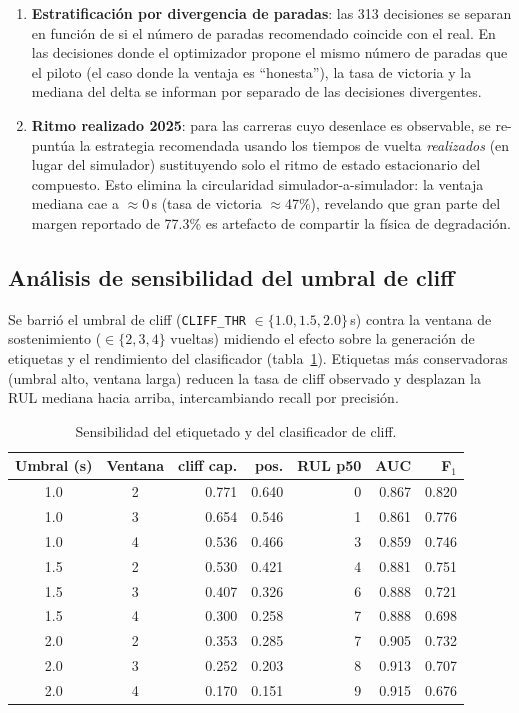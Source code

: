 \documentclass[conference]{IEEEtran}
\begin{document}
\begin{enumerate}
  \item \textbf{Estratificación por divergencia de paradas}: las 313
        decisiones se separan en función de si el número de paradas
        recomendado coincide con el real. En las decisiones donde el
        optimizador propone el mismo número de paradas que el piloto
        (el caso donde la ventaja es ``honesta''), la tasa de victoria y
        la mediana del delta se informan por separado de las decisiones
        divergentes.
  \item \textbf{Ritmo realizado 2025}: para las carreras cuyo desenlace es
        observable, se re-puntúa la estrategia recomendada usando los tiempos
        de vuelta \emph{realizados} (en lugar del simulador) sustituyendo solo
        el ritmo de estado estacionario del compuesto. Esto elimina la
        circularidad simulador-a-simulador: la ventaja mediana cae a
        $\approx$0\,s (tasa de victoria $\approx$47\%), revelando que gran
        parte del margen reportado de 77.3\% es artefacto de compartir la
        física de degradación.
\end{enumerate}

\subsection{Análisis de sensibilidad del umbral de cliff}

Se barrió el umbral de cliff (\texttt{CLIFF\_THR} $\in \{1.0,1.5,2.0\}$\,s)
contra la ventana de sostenimiento ($\in \{2,3,4\}$ vueltas) midiendo el
efecto sobre la generación de etiquetas y el rendimiento del clasificador
(tabla~\ref{tab:sensitivity}). Etiquetas más conservadoras (umbral alto,
ventana larga) reducen la tasa de cliff observado y desplazan la RUL mediana
hacia arriba, intercambiando recall por precisión.

\begin{table}[!htbp]
\centering
\caption{Sensibilidad del etiquetado y del clasificador de cliff.}
\label{tab:sensitivity}
\small
\begin{tabular}{ccrrrrr}
\toprule
\textbf{Umbral (s)} & \textbf{Ventana} & \textbf{cliff cap.} & \textbf{pos.} & \textbf{RUL p50} & \textbf{AUC} & \textbf{F$_1$} \\
\midrule
1.0 & 2 & 0.771 & 0.640 & 0 & 0.867 & 0.820 \\
1.0 & 3 & 0.654 & 0.546 & 1 & 0.861 & 0.776 \\
1.0 & 4 & 0.536 & 0.466 & 3 & 0.859 & 0.746 \\
1.5 & 2 & 0.530 & 0.421 & 4 & 0.881 & 0.751 \\
1.5 & 3 & 0.407 & 0.326 & 6 & 0.888 & 0.721 \\
1.5 & 4 & 0.300 & 0.258 & 7 & 0.888 & 0.698 \\
2.0 & 2 & 0.353 & 0.285 & 7 & 0.905 & 0.732 \\
2.0 & 3 & 0.252 & 0.203 & 8 & 0.913 & 0.707 \\
2.0 & 4 & 0.170 & 0.151 & 9 & 0.915 & 0.676 \\
\bottomrule
\end{tabular}
\end{table}
\end{document}
